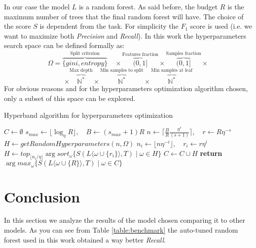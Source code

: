 \documentclass[11pt, a4paper]{article}
\begin{document}
  In our case the model $L$ is a random forest.
  As said before, the budget $R$ is the maximum number of trees that the final random forest will have.
  The choice of the score $S$ is dependent from the task.
  For simplicity the $F_{1}$ score is used (i.e. we want to maximize both \textit{Precision} and \textit{Recall}).
  In this work the hyperparameters search space can be defined formally as:
  \[\Omega = \overbrace{\{gini, entropy\}}^{\text{Split criterion}} \quad\times \overbrace{(0, 1]}^{\text{Features fraction}} \times \overbrace{(0, 1]}^{\text{Samples fraction}} \times\]
  \[\times \overbrace{\mathbb{N}^{*}}^{\text{Max depth}} \times \overbrace{\mathbb{N}^{*}}^{\text{Min samples to split}} \times \overbrace{\mathbb{N}^{*}}^{\text{Min samples at leaf}}\]
  For obvious reasons and for the hyperparameters optimization algorithm chosen, only a subset of this space can be explored.

  \begin{algorithm}
    \caption{Hyperband algorithm for hyperparameters optimization}
    \label{algorithm:hyperband}
    \begin{algorithmic}[1]
        \State $C \gets \emptyset$
        \State $s_{max} \gets \lfloor \log_{\eta}{R} \rfloor, \quad B \gets (s_{max} + 1)R$
          \State $n \gets \lceil \frac{B}{R}\frac{\eta^{s}}{(s+1)} \rceil, \quad r \gets R\eta^{-s}$
          \State $H \gets getRandomHyperparameters(n,\Omega)$
            \State $n_{i} \gets \lfloor n\eta^{-i} \rfloor, \quad r_{i} \gets r\eta^{i}$
            \State $H \gets top_{\lfloor n_{i}/\eta \rfloor} \arg sort_{\omega} \{S(L\langle\omega \cup \{r_{i}\}\rangle, T) \mid \omega \in H\}$
          \EndFor
          \State $C \gets C \cup H$
        \EndFor
        \State \textbf{return} $\arg max_{\omega} \{S(L\langle\omega \cup \{R\}\rangle, T) \mid \omega \in C\}$
      \EndProcedure
    \end{algorithmic}
  \end{algorithm}

\clearpage

\section{Conclusion}
  In this section we analyze the results of the model chosen comparing it to other models.
  As you can see from Table \ref{table:benchmark} the auto-tuned random forest used in this work obtained a way better \textit{Recall}.
\end{document}
